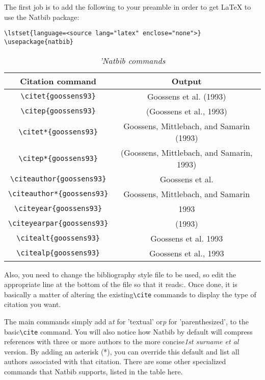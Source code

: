 The first job is to add the following to your preamble in order to get LaTeX to
use the Natbib package:

\begin{lstlisting}
\lstset{language=<source lang="latex" enclose="none">}
\usepackage{natbib}
\end{lstlisting}

\begin{table}
\caption{\textit{'Natbib commands}}
\begin{tabular}{c c} \hline
 Citation command
&  Output
\\ \hline
 \verb|\citet{goossens93}|
&  Goossens et al. (1993)
\\ \hline
\verb|\citep{goossens93}|
&  (Goossens et al., 1993)
\\ \hline
 \verb|\citet*{goossens93}|
&  Goossens, Mittlebach, and Samarin (1993)
\\ \hline
 \verb|\citep*{goossens93}|
&  (Goossens, Mittlebach, and Samarin, 1993)
\\ \hline
 \verb|\citeauthor{goossens93}|
&  Goossens et al.
\\ \hline
 \verb|\citeauthor*{goossens93}|
&  Goossens, Mittlebach, and Samarin
\\ \hline
 \verb|\citeyear{goossens93}|
&  1993
\\ \hline
 \verb|\citeyearpar{goossens93}|
&  (1993)
\\ \hline
 \verb|\citealt{goossens93}|
&  Goossens et al. 1993
\\ \hline
 \verb|\citealp{goossens93}|
&  Goossens et al., 1993
\end{tabular}
\end{table}

Also, you need to change the bibliography style file to be used, so edit the
appropriate line at the bottom of the file so that it
reads:\verb||. Once done, it is basically a matter
of altering the existing\verb|\cite| commands to display the type of citation
you want.

The main commands simply add a\textit{t} for 'textual' or\textit{p} for
'parenthesized', to the basic\verb|\cite| command. You will also notice how
Natbib by default will compress references with three or more authors to the
more concise\textit{1st surname et al} version. By adding an asterisk (*), you
can override this default and list all authors associated with that citation.
There are some other specialized commands that Natbib supports, listed in the
table here.

